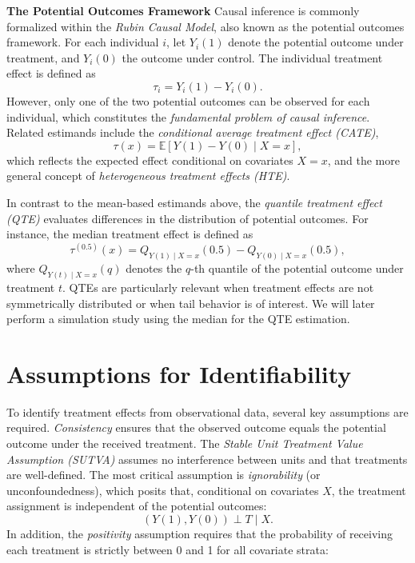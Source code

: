 \textbf{The Potential Outcomes Framework } Causal inference is commonly formalized within the \textit{Rubin Causal Model}, also known as the potential outcomes framework. For each individual $i$, let $Y_i(1)$ denote the potential outcome under treatment, and $Y_i(0)$ the outcome under control. The individual treatment effect is defined as
\begin{equation}
\tau_i = Y_i(1) - Y_i(0).
\end{equation}
However, only one of the two potential outcomes can be observed for each individual, which constitutes the \textit{fundamental problem of causal inference}. Related estimands include the \textit{conditional average treatment effect (CATE)},
\begin{equation}
\tau(x) = \mathbb{E}[Y(1) - Y(0) \mid X = x],
\end{equation}
which reflects the expected effect conditional on covariates $X = x$, and the more general concept of \textit{heterogeneous treatment effects (HTE)}.

In contrast to the mean-based estimands above, the \textit{quantile treatment effect (QTE)} evaluates differences in the distribution of potential outcomes. For instance, the median treatment effect is defined as
\begin{equation}
\tau^{(0.5)}(x) = Q_{Y(1) \mid X = x}(0.5) - Q_{Y(0) \mid X = x}(0.5),
\end{equation}
where $Q_{Y(t) \mid X = x}(q)$ denotes the $q$-th quantile of the potential outcome under treatment $t$. QTEs are particularly relevant when treatment effects are not symmetrically distributed or when tail behavior is of interest. We will later perform a simulation study using the median for the QTE estimation.

\section{Assumptions for Identifiability}

To identify treatment effects from observational data, several key assumptions are required. \textit{Consistency} ensures that the observed outcome equals the potential outcome under the received treatment. The \textit{Stable Unit Treatment Value Assumption (SUTVA)} assumes no interference between units and that treatments are well-defined. The most critical assumption is \textit{ignorability} (or unconfoundedness), which posits that, conditional on covariates $X$, the treatment assignment is independent of the potential outcomes:
\begin{equation}
(Y(1), Y(0)) \perp T \mid X.
\end{equation}
In addition, the \textit{positivity} assumption requires that the probability of receiving each treatment is strictly between 0 and 1 for all covariate strata:

